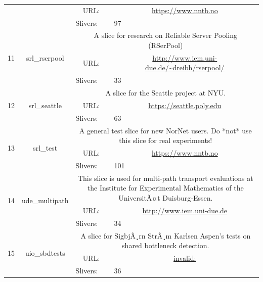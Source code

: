 \begin{small}
\begin{center}
\begin{longtable}{|c|c|c|c|}
  &  & \multicolumn{1}{|p{5em}|}{URL:} & \multicolumn{1}{|p{22.5em}|}{\url{https://www.nntb.no}} \\* \cline{3-3}\cline{4-4}
  &  & \multicolumn{1}{|l|}{Slivers:} & \multicolumn{1}{|l|}{97} \\ \hline
 \multirow{3}{*}{11} & \multirow{3}{*}{\index{srl\_rserpool}\index{Slice!srl\_rserpool}srl\_rserpool} & \multicolumn{2}{|p{30em}|}{A slice for research on Reliable Server Pooling (RSerPool)} \\* \cline{3-3}\cline{4-4}
  &  & \multicolumn{1}{|p{5em}|}{URL:} & \multicolumn{1}{|p{22.5em}|}{\url{http://www.iem.uni-due.de/~dreibh/rserpool/}} \\* \cline{3-3}\cline{4-4}
  &  & \multicolumn{1}{|l|}{Slivers:} & \multicolumn{1}{|l|}{33} \\ \hline
 \multirow{3}{*}{12} & \multirow{3}{*}{\index{srl\_seattle}\index{Slice!srl\_seattle}srl\_seattle} & \multicolumn{2}{|p{30em}|}{A slice for the Seattle project at NYU.} \\* \cline{3-3}\cline{4-4}
  &  & \multicolumn{1}{|p{5em}|}{URL:} & \multicolumn{1}{|p{22.5em}|}{\url{https://seattle.poly.edu}} \\* \cline{3-3}\cline{4-4}
  &  & \multicolumn{1}{|l|}{Slivers:} & \multicolumn{1}{|l|}{63} \\ \hline
 \multirow{3}{*}{13} & \multirow{3}{*}{\index{srl\_test}\index{Slice!srl\_test}srl\_test} & \multicolumn{2}{|p{30em}|}{A general test slice for new NorNet users. Do *not* use this slice for real experiments!} \\* \cline{3-3}\cline{4-4}
  &  & \multicolumn{1}{|p{5em}|}{URL:} & \multicolumn{1}{|p{22.5em}|}{\url{https://www.nntb.no}} \\* \cline{3-3}\cline{4-4}
  &  & \multicolumn{1}{|l|}{Slivers:} & \multicolumn{1}{|l|}{101} \\ \hline
 \multirow{3}{*}{14} & \multirow{3}{*}{\index{ude\_multipath}\index{Slice!ude\_multipath}ude\_multipath} & \multicolumn{2}{|p{30em}|}{This slice is used for multi-path transport evaluations at the Institute for Experimental Mathematics of the UniversitÃ¤t Duisburg-Essen.} \\* \cline{3-3}\cline{4-4}
  &  & \multicolumn{1}{|p{5em}|}{URL:} & \multicolumn{1}{|p{22.5em}|}{\url{http://www.iem.uni-due.de}} \\* \cline{3-3}\cline{4-4}
  &  & \multicolumn{1}{|l|}{Slivers:} & \multicolumn{1}{|l|}{34} \\ \hline
 \multirow{3}{*}{15} & \multirow{3}{*}{\index{uio\_sbdtests}\index{Slice!uio\_sbdtests}uio\_sbdtests} & \multicolumn{2}{|p{30em}|}{A slice for SigbjÃ¸rn StrÃ¸m Karlsen Aspen's tests on shared bottleneck detection.} \\* \cline{3-3}\cline{4-4}
  &  & \multicolumn{1}{|p{5em}|}{URL:} & \multicolumn{1}{|p{22.5em}|}{\url{invalid:}} \\* \cline{3-3}\cline{4-4}
  &  & \multicolumn{1}{|l|}{Slivers:} & \multicolumn{1}{|l|}{36} \\ \hline
\end{longtable}
\end{center}
\end{small}
